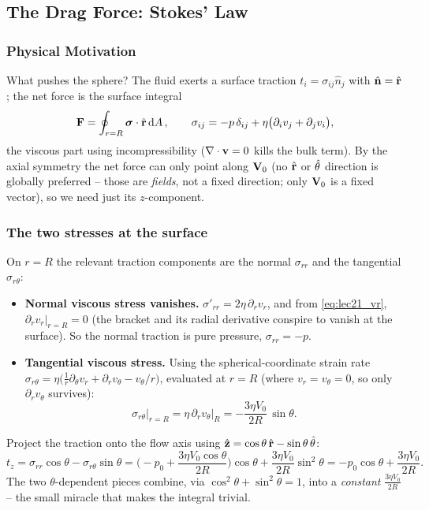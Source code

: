 \documentclass[../main.tex]{subfiles}
\begin{document}
\subsection{The Drag Force: Stokes' Law}\label{sec:lec21:drag}

\subsubsection*{Physical Motivation}
What pushes the sphere? The fluid exerts a surface traction $t_i=\sigma_{ij}\hat n_j$ with $\hat{\mathbf{n}}=\hat{\mathbf{r}}$; the net force is the surface integral
\begin{equation}
  \mathbf{F}=\oint_{r=R}\boldsymbol{\sigma}\cdot\hat{\mathbf{r}}\dd{A},\qquad
  \sigma_{ij}=-p\,\delta_{ij}+\eta\big(\partial_i v_j+\partial_j v_i\big),
  \label{eq:lec21_force_def}
\end{equation}
the viscous part using incompressibility ($\nabla \cdot\mathbf{v}=0$ kills the bulk term). By the axial symmetry the net force can only point along $\mathbf{V}_0$ (no $\hat{\mathbf{r}}$ or $\hat{\mathbf{\theta}}$ direction is globally preferred -- those are \emph{fields}, not a fixed direction; only $\mathbf{V}_0$ is a fixed vector), so we need just its $z$-component.

\subsubsection*{The two stresses at the surface}
On $r=R$ the relevant traction components are the normal $\sigma_{rr}$ and the tangential $\sigma_{r\theta}$:
\begin{itemize}
  \item \textbf{Normal viscous stress vanishes.} $\sigma'_{rr}=2\eta\,\partial_r v_r$, and from \eqref{eq:lec21_vr}, $\partial_r v_r\big|_{r=R}=0$ (the bracket and its radial derivative conspire to vanish at the surface). So the normal traction is pure pressure, $\sigma_{rr}=-p$.
  \item \textbf{Tangential viscous stress.} Using the spherical-coordinate strain rate $\sigma_{r\theta}=\eta\big(\tfrac1r\partial_\theta v_r+\partial_r v_\theta-v_\theta/r\big)$, evaluated at $r=R$ (where $v_r=v_\theta=0$, so only $\partial_r v_\theta$ survives):
  \begin{equation}
    \sigma_{r\theta}\big|_{r=R}=\eta\,\partial_r v_\theta\big|_{R}=-\frac{3\eta V_0}{2R}\,\sin\theta .
    \label{eq:lec21_srtheta}
  \end{equation}
\end{itemize}
Project the traction onto the flow axis using $\hat{\mathbf{z}}=\cos\theta\,\hat{\mathbf{r}}-\sin\theta\,\hat{\mathbf{\theta}}$:
\begin{equation}
  t_z=\sigma_{rr}\cos\theta-\sigma_{r\theta}\sin\theta
     =\Big(-p_0+\frac{3\eta V_0\cos\theta}{2R}\Big)\cos\theta
       +\frac{3\eta V_0}{2R}\sin^2\theta
     =-p_0\cos\theta+\frac{3\eta V_0}{2R}.
  \label{eq:lec21_tz}
\end{equation}
The two $\theta$-dependent pieces combine, via $\cos^2\theta+\sin^2\theta=1$, into a \emph{constant} $\tfrac{3\eta V_0}{2R}$ -- the small miracle that makes the integral trivial.
\end{document}
